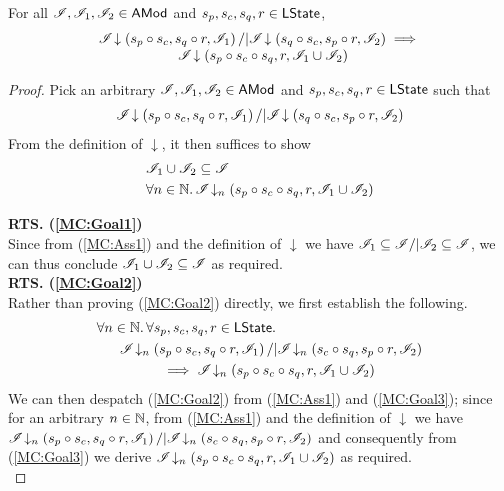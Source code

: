 \begin{lemma}\label{lem:merge-closure}
For all $\mathscr{I}, \mathscr{I}_1, \mathscr{I}_2 \in \textsf{AMod}$ and $s_p, s_c, s_q, r \in \textsf{LState}$,
%
\[
\begin{array}{l}
	\mathscr{I} \!\downarrow \left(s_p \circ s_c, s_q \circ r, \mathscr{I}_{1}\right) /| \mathscr{I} \!\downarrow \left(s_q \circ s_c, s_p \circ r, \mathscr{I}_{2}\right)
	\implies\\
	\hspace*{2cm} \mathscr{I} \!\downarrow \left(s_p \circ s_c \circ s_q, r, \mathscr{I}_{1} \cup \mathscr{I}_{2}\right)
\end{array}
\]
%
\begin{proof} Pick an arbitrary $\mathscr{I}, \mathscr{I}_1, \mathscr{I}_2 \in \textsf{AMod}$ and $s_p, s_c, s_q, r \in \textsf{LState}$ such that 
%
\begin{align}
	\mathscr{I} \!\downarrow \left(s_p \circ s_c, s_q \circ r, \mathscr{I}_{1}\right) /| \mathscr{I} \!\downarrow \left(s_q \circ s_c, s_p \circ r, \mathscr{I}_{2}\right) \label{MC:Ass1}
\end{align} 
%
From the definition of $\downarrow$, it then suffices to show
%
\begin{align}
	& \mathscr{I}_1 \cup \mathscr{I}_2  \subseteq \mathscr{I} \label{MC:Goal1}\\
	& \forall n \in \mathbb{N}.\,  \mathscr{I} \!\downarrow_{n} \left(s_p \circ s_c \circ s_q, r, \mathscr{I}_{1} \cup \mathscr{I}_{2}\right) \label{MC:Goal2}
\end{align}
%

\noindent\textbf{RTS. (\ref{MC:Goal1})} \\
Since from (\ref{MC:Ass1}) and the definition of $\downarrow$ we have $\mathscr{I}_1 \subseteq \mathscr{I} /| \mathscr{I}_2 \subseteq \mathscr{I}$, we can thus conclude $\mathscr{I}_1 \cup \mathscr{I}_2 \subseteq \mathscr{I}$ as required. \\

\noindent\textbf{RTS. (\ref{MC:Goal2})} \\
Rather than proving (\ref{MC:Goal2}) directly, we first establish the following.
%
\begin{align}
	\for {n \in \Nats} \for{s_p, s_c, s_q, r \in \LStates} & \nonumber\\
	& \hspace{-4cm}\extendsAMUpto{\lmod}{n}{s_p \composeL s_c}{s_q \composeL r}{\lmod_1} /| \extendsAMUpto{\lmod}{n}{s_c \composeL s_q}{s_p \composeL r}{\lmod_2} \nonumber\\
	& \hspace{-3cm} \implies \extendsAMUpto{\lmod}{n}{s_p \composeL s_c \composeL s_q}{r}{\lmod_1 \cup \lmod_2} \label{MC:Goal3}
\end{align}
%
We can then despatch (\ref{MC:Goal2}) from (\ref{MC:Ass1}) and (\ref{MC:Goal3}); since for an arbitrary $n \in \mathbb{N}$, from (\ref{MC:Ass1}) and the definition of $\downarrow$ we have $\mathscr{I} \!\downarrow_{n} \left(s_p \circ s_c, s_q \circ r, \mathscr{I}_1\right) /| \mathscr{I} \!\downarrow_{n} \left(s_c \circ s_q, s_p \circ r, \mathscr{I}_2\right)$ and consequently from (\ref{MC:Goal3}) we derive $\mathscr{I} \!\downarrow_{n} \left(s_p \circ s_c \circ s_q, r, \mathscr{I}_1 \cup \mathscr{I}_2\right)$ as required. \\


\end{proof}
\end{lemma}

